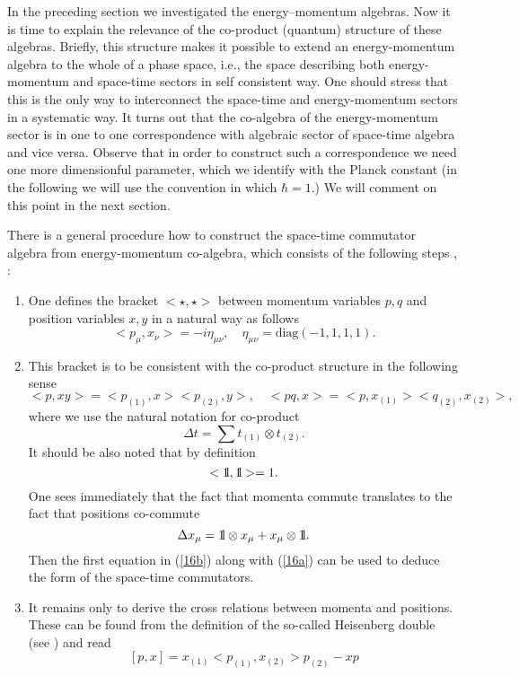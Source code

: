 \documentclass[a4paper,a4paper]{article}
\def\bbbone{{\mathchoice {\rm 1\mskip-4mu l} {\rm 1\mskip-4mu l}
{\rm 1\mskip-4.5mu l} {\rm 1\mskip-5mu l}}}
\begin{document}
In the preceding section we investigated the energy--momentum
algebras. Now it is time to explain the  relevance of the
co-product (quantum) structure of these algebras. Briefly, this
structure makes it possible to extend an energy-momentum algebra
to the whole of a phase space, i.e., the space describing both
energy-momentum and space-time sectors in self consistent way. One
should stress that this is the only way to interconnect the
space-time and energy-momentum sectors in a systematic way. It
turns out that the co-algebra  of the energy-momentum sector is in
one to one correspondence with algebraic sector of space-time
algebra and vice versa. Observe that in order to construct such a
correspondence we need one more dimensionful parameter, which we
identify with the Planck constant (in the following we will use
the convention in which $\hbar=1$.) We will comment on this point
in the next section.

There is a  general procedure how to construct the space-time
commutator algebra from energy-momentum  co-algebra, which
consists of the following steps \cite{maru}, \cite{crossalg}:

\begin{enumerate}
\item One defines the bracket $<\star, \star>$ between momentum variables $p,q$ and position variables $x,y$ in
a natural way as follows
\begin{equation}\label{16a}
 <p_\mu, x_\nu> =  -i \eta_{\mu\nu}, \quad \eta_{\mu\nu} = \mbox{diag}(-1,1,1,1).
\end{equation}
\item This bracket is to be consistent with the co-product structure in the following sense
\begin{equation}\label{16b}
 <p, xy> = <p_{(1)}, x><p_{(2)}, y>, \quad <pq,x> =<p, x_{(1)}><q_{(2)}, x_{(2)}>,
\end{equation}
where we use the natural notation for co-product $$\Delta t = \sum
t_{(1)} \otimes t_{(2)}.$$ It should be also  noted that by
definition $$<\bbbone, \bbbone> =1.$$ One sees immediately that
the fact that momenta commute translates to the fact that
positions co-commute
\begin{equation}\label{16c}
  \Delta x_\mu = \bbbone \otimes x_\mu + x_\mu \otimes \bbbone.
\end{equation}
Then the first equation in (\ref{16b}) along with (\ref{16a}) can be used to deduce the form of the space-time commutators.
\item  It remains only to derive the cross relations between momenta and positions. These can be found
from the definition of the so-called Heisenberg double (see \cite{crossalg}) and read
\begin{equation}\label{16d}
 [p,x] =  x_{(1)}<p_{(1)}, x_{(2)}>p_{(2)}-xp
\end{equation}
\end{enumerate}
\end{document}
